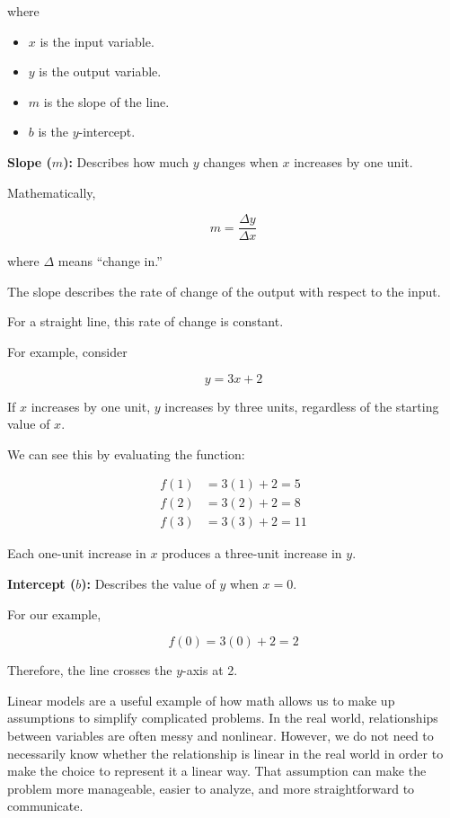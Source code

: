 \documentclass[12pt]{article}
\begin{document}
where

\begin{itemize}
    \item $x$ is the input variable.
    \item $y$ is the output variable.
    \item $m$ is the slope of the line.
    \item $b$ is the $y$-intercept.
\end{itemize}

\textbf{Slope ($m$):} Describes how much $y$ changes when $x$ increases by one unit.

Mathematically,

\[
m=\frac{\Delta y}{\Delta x}
\]

where $\Delta$ means ``change in.''

The slope describes the rate of change of the output with respect to the input.

For a straight line, this rate of change is constant.

For example, consider

\[
y=3x+2
\]

If $x$ increases by one unit, $y$ increases by three units, regardless of the starting value of $x$.

We can see this by evaluating the function:

\begin{align*}
f(1)&=3(1)+2=5\\
f(2)&=3(2)+2=8\\
f(3)&=3(3)+2=11
\end{align*}

Each one-unit increase in $x$ produces a three-unit increase in $y$.

\textbf{Intercept ($b$):} Describes the value of $y$ when $x=0$.

For our example,

\[
f(0)=3(0)+2=2
\]

Therefore, the line crosses the $y$-axis at 2.

Linear models are a useful example of how math allows us to make up assumptions to simplify complicated problems. In the real world, relationships between variables are often messy and nonlinear. However, we do not need to necessarily know whether the relationship is linear in the real world in order to make the choice to represent it a linear way. That assumption can make the problem more manageable, easier to analyze, and more straightforward to communicate.
\end{document}
